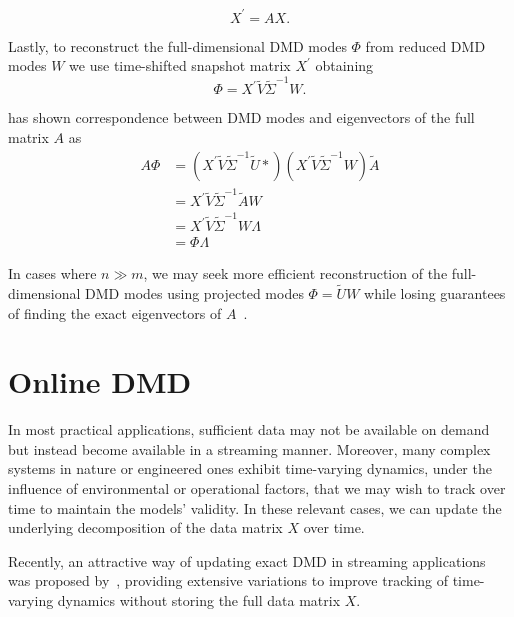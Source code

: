 \begin{equation*}
    X^\prime = AX.
\end{equation*}

Lastly, to reconstruct the full-dimensional DMD modes \(\Phi \) from reduced DMD modes \(W\) we use time-shifted snapshot matrix \(X^\prime \) obtaining
\begin{equation}\label{eq:full-dmd-modes}
    \Phi = X^\prime \tilde{V} \tilde{\Sigma}^{-1} W.
\end{equation}

\cite{Tu2013} has shown correspondence between DMD modes and eigenvectors of the full matrix \(A\) as
\begin{align*}
    A\Phi
     & = (X^\prime \tilde{V} \tilde{\Sigma}^{-1} \tilde{U}*) (X^\prime \tilde{V} \tilde{\Sigma}^{-1} W)
    \tilde{A}                                                                                           \\
     & = X^\prime \tilde{V} \tilde{\Sigma}^{-1} \tilde{A} W                                             \\
     & = X^\prime \tilde{V} \tilde{\Sigma}^{-1} W \Lambda                                               \\
     & = \Phi \Lambda
\end{align*}

In cases where \(n \gg m\), we may seek more efficient reconstruction of the full-dimensional DMD modes using projected modes \(\Phi = \tilde{U} W\) while losing guarantees of finding the exact eigenvectors of \(A\)~\cite{Schmid2010}.

\section{Online DMD}\label{app:online-dmd}
In most practical applications, sufficient data may not be available on demand but instead become available in a streaming manner. Moreover, many complex systems in nature or engineered ones exhibit time-varying dynamics, under the influence of environmental or operational factors, that we may wish to track over time to maintain the models' validity. In these relevant cases, we can update the underlying decomposition of the data matrix \(X\) over time.

Recently, an attractive way of updating exact DMD in streaming applications was proposed by~\cite{Zhang2019}, providing extensive variations to improve tracking of time-varying dynamics without storing the full data matrix \(X\).

